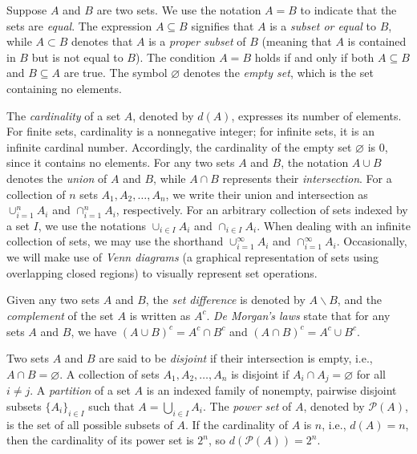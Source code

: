Suppose $A$ and $B$ are two sets. We use the notation $A = B$ to indicate that the sets are \emph{equal}. The expression $A \subseteq B$ signifies that $A$ is a \emph{subset or equal} to $B$, while $A \subset B$ denotes that $A$ is a \emph{proper subset} of $B$ (meaning that $A$ is contained in $B$ but is not equal to $B$). The condition $A = B$ holds if and only if both $A \subseteq B$ and $B \subseteq A$ are true. The symbol $\varnothing$ denotes the \emph{empty set}, which is the set containing no elements.

The \emph{cardinality} of a set $A$, denoted by $d(A)$, expresses its number of elements. For finite sets, cardinality is a nonnegative integer; for infinite sets, it is an infinite cardinal number. Accordingly, the cardinality of the empty set $\varnothing$ is 0, since it contains no elements. For any two sets $A$ and $B$, the notation $A \cup B$ denotes the \emph{union} of $A$ and $B$, while $A \cap B$ represents their \emph{intersection}. For a collection of $n$ sets $A_1, A_2, \ldots, A_n$, we write their union and intersection as $\cup_{i=1}^n A_i$ and $\cap_{i=1}^n A_i$, respectively. For an arbitrary collection of sets indexed by a set $I$, we use the notations $\cup_{i \in I} A_i$ and $\cap_{i \in I} A_i$. When dealing with an infinite collection of sets, we may use the shorthand $\cup_{i=1}^{\infty} A_i$ and $\cap_{i=1}^{\infty} A_i$. Occasionally, we will make use of \emph{Venn diagrams} (a graphical representation of sets using overlapping closed regions) to visually represent set operations.

Given any two sets $A$ and $B$, the \emph{set difference} is denoted by $A \backslash B$, and the \emph{complement} of the set $A$ is written as $A^c$. \emph{De Morgan's laws} state that for any sets $A$ and $B$, we have $\left( A \cup B \right)^c = A^c \cap B^c$ and $\left( A \cap B \right)^c = A^c \cup B^c$.

Two sets $A$ and $B$ are said to be \emph{disjoint} if their intersection is empty, i.e., $A \cap B = \varnothing$. A collection of sets $A_1, A_2, \ldots, A_n$ is disjoint if $A_i \cap A_j = \varnothing$ for all $i \neq j$. A \emph{partition} of a set $A$ is an indexed family of nonempty, pairwise disjoint subsets $\{A_i\}_{i \in I}$ such that $A = \bigcup_{i \in I} A_i$. The \emph{power set} of $A$, denoted by $\mathcal{P}(A)$, is the set of all possible subsets of $A$. If the cardinality of $A$ is $n$, i.e., $d(A) = n$, then the cardinality of its power set is $2^n$, so $d\left( \mathcal{P}(A) \right) = 2^n$.

